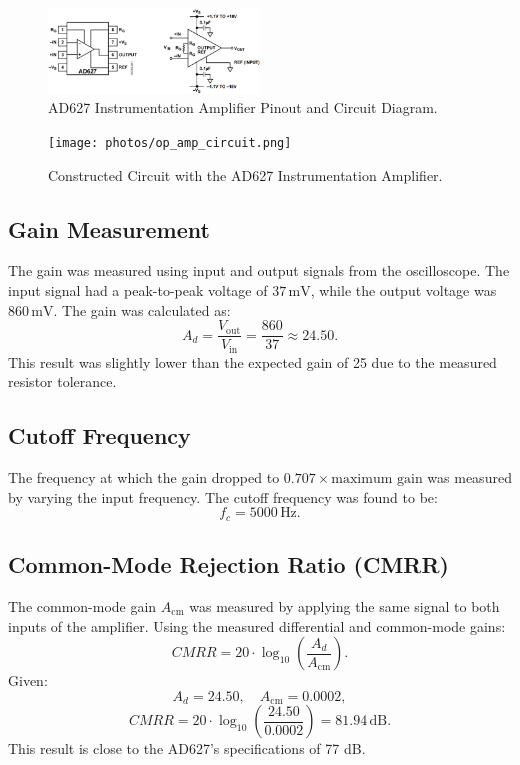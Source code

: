 \begin{figure}[H]
  \centering
  \includegraphics[width=0.5\textwidth]{photos/ad627_instrumentation_amplifier_pinout_and_diagram.png}
  \caption{AD627 Instrumentation Amplifier Pinout and Circuit Diagram.}
  \label{fig:ad627_diagram}
\end{figure}

\begin{figure}[H]
  \centering
  \texttt{[image: photos/op\_amp\_circuit.png]}
  \caption{Constructed Circuit with the AD627 Instrumentation Amplifier.}
  \label{fig:circuit}
\end{figure}

\subsection{Gain Measurement}
The gain was measured using input and output signals from the oscilloscope. The input signal had a peak-to-peak voltage of
\( 37 \, \text{mV} \), while the output voltage was \( 860 \, \text{mV} \). The gain was calculated as:
\[
  A_d = \frac{V_\text{out}}{V_\text{in}} = \frac{860}{37} \approx 24.50.
\]
This result was slightly lower than the expected gain of 25 due to the measured resistor tolerance.

\subsection{Cutoff Frequency}
The frequency at which the gain dropped to \( 0.707 \times \text{maximum gain} \) was measured by varying the input frequency.
The cutoff frequency was found to be:
\[
  f_c = 5000 \, \text{Hz}.
\]

\subsection{Common-Mode Rejection Ratio (CMRR)}
The common-mode gain \( A_\text{cm} \) was measured by applying the same signal to both inputs of the amplifier. Using the measured
differential and common-mode gains:
\[
  CMRR = 20 \cdot \log_{10}\left(\frac{A_d}{A_\text{cm}}\right).
\]
Given:
\[
  A_d = 24.50, \quad A_\text{cm} = 0.0002,
\]
\[
  CMRR = 20 \cdot \log_{10}\left(\frac{24.50}{0.0002}\right) = 81.94 \, \text{dB}.
\]
This result is close to the AD627's specifications of 77 dB.


